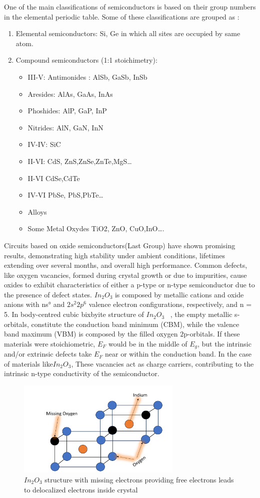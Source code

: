 One of the main classifications of semiconductors is based on their group numbers in the elemental periodic table. Some of these classifications are grouped as :
\begin{enumerate}
    \item Elemental semiconductors: Si, Ge in which all sites are occupied by same atom.
    \item Compound semiconductors (1:1 stoichimetry):
    \begin{itemize}
    \item III-V: Antimonides : AlSb, GaSb, InSb
    \item Aresides: AlAs, GaAs, InAs
    \item Phoshides: AlP, GaP, InP
    \item Nitrides: AlN, GaN, InN
    \item IV-IV: SiC
    \item II-VI: CdS, ZnS,ZnSe,ZnTe,MgS…
    \item II-VI CdSe,CdTe
    \item IV-VI PbSe, PbS,PbTe…
    \item Alloys
    \item Some Metal Oxydes TiO2, ZnO, CuO,InO….
\end{itemize}
\end{enumerate}
Circuits based on oxide semiconductors(Last Group) have shown promising results, demonstrating high stability under ambient conditions, lifetimes extending over several months, and overall high performance.
Common defects, like oxygen vacancies, formed during crystal growth or due to impurities, cause oxides to exhibit characteristics of either a p-type or n-type semiconductor due to the presence of defect states.
$In_2O_3$ is composed by metallic cations and oxide anions with ns° and $2s^2 2p^6$ valence electron configurations, respectively, and n = 5. 
In body-centred cubic bixbyite structure of $In_2O_3$  ~\cite{ref11}, the empty metallic s-orbitals,  constitute the conduction band minimum (CBM), while the valence band maximum (VBM) is composed by the filled oxygen $2$p-orbitals. If these materials were stoichiometric, $E_F$ would be in the middle of $E_g$, but the intrinsic and/or extrinsic defects take $E_F$ near or within the conduction band.
In the case of materials like$ In_2O_3$,  These vacancies act as charge carriers, contributing to the intrinsic n-type conductivity of the semiconductor.
\begin{figure}
    \centering
    \includegraphics[width=0.7\textwidth]{figures/fig16.png}
    \caption{$In_2O_3$ structure with missing electrons providing free electrons leads to delocalized electrons inside crystal}
    \label{fig16}
\end{figure}

